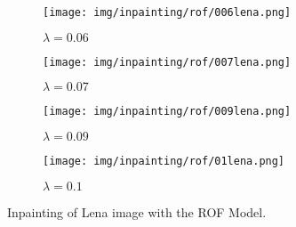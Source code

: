 \begin{figure}[ht]
    \centering
    \begin{subfigure}[b]{0.45\textwidth}
        \texttt{[image: img/inpainting/rof/006lena.png]}
        \caption{$\lambda = 0.06$}
    \end{subfigure}
    \begin{subfigure}[b]{0.45\textwidth}
        \texttt{[image: img/inpainting/rof/007lena.png]}
        \caption{$\lambda = 0.07$}
    \end{subfigure}
    \begin{subfigure}[b]{0.45\textwidth}
        \texttt{[image: img/inpainting/rof/009lena.png]}
        \caption{$\lambda = 0.09$}
    \end{subfigure}
    \begin{subfigure}[b]{0.45\textwidth}
        \texttt{[image: img/inpainting/rof/01lena.png]}
        \caption{$\lambda = 0.1$}
    \end{subfigure}
    \caption{Inpainting of Lena image with the ROF Model.}
\label{fig:inpainting_lena_rof}
\end{figure}